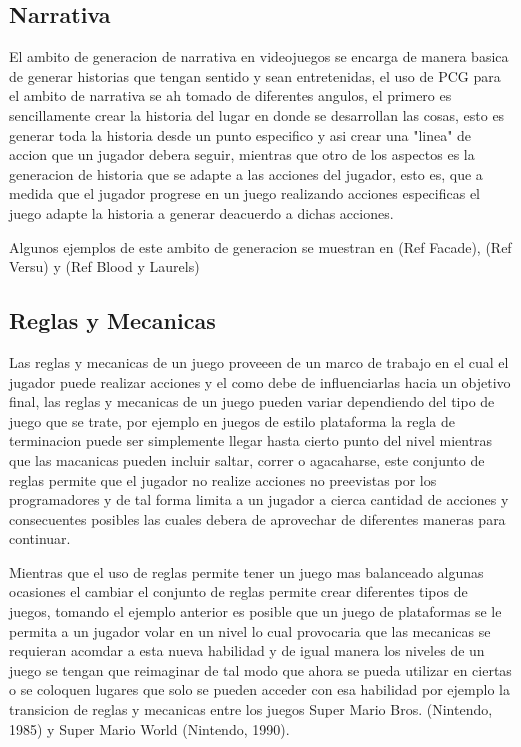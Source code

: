 \subsection{Narrativa}
\label{subsection:Narrative}

El ambito de generacion de narrativa en videojuegos se encarga de manera basica
de generar historias que tengan sentido y sean entretenidas, el uso de PCG para
el ambito de narrativa se ah tomado de diferentes angulos, el primero es
sencillamente crear la historia del lugar en donde se desarrollan las cosas,
esto es generar toda la historia desde un punto especifico y asi crear una
"linea" de accion que un jugador debera seguir, mientras que otro de los
aspectos es la generacion de historia que se adapte a las acciones del jugador,
esto es, que a medida que el jugador progrese en un juego realizando acciones
especificas el juego adapte la historia a generar deacuerdo a dichas acciones.

Algunos ejemplos de este ambito de generacion se muestran en (Ref Facade), (Ref
Versu) y (Ref Blood y Laurels)

\subsection{Reglas y Mecanicas}
\label{subsection:rulesandmechanics}

Las reglas y mecanicas de un juego proveeen de un marco de trabajo en el cual el
jugador puede realizar acciones y el como debe de influenciarlas hacia un
objetivo final, las reglas y mecanicas de un juego pueden variar dependiendo del
tipo de juego que se trate, por ejemplo en juegos de estilo plataforma la regla
de terminacion puede ser simplemente llegar hasta cierto punto del nivel
mientras que las macanicas pueden incluir saltar, correr o agacaharse, este
conjunto de reglas permite que el jugador no realize acciones no preevistas por
los programadores y de tal forma limita a un jugador a cierca cantidad de
acciones y consecuentes posibles las cuales debera de aprovechar de diferentes
maneras para continuar.

Mientras que el uso de reglas permite tener un juego mas balanceado algunas
ocasiones el cambiar el conjunto de reglas permite crear diferentes tipos de
juegos, tomando el ejemplo anterior es posible que un juego de plataformas se le
permita a un jugador volar en un nivel lo cual provocaria que las mecanicas se
requieran acomdar a esta nueva habilidad y de igual manera los niveles de un
juego se tengan que reimaginar de tal modo que ahora se pueda utilizar en
ciertas o se coloquen lugares que solo se pueden acceder con esa habilidad por
ejemplo la transicion de reglas y mecanicas entre los juegos Super Mario Bros.
(Nintendo, 1985) y Super Mario World (Nintendo, 1990).

